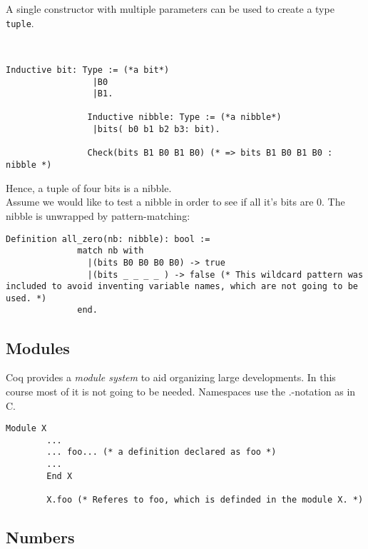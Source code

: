 	    A single constructor with multiple parameters can be used to create a type \lstinline!tuple!.
		\begin{example}~\\\vspace{-10mm}
	 	 	{\normalfont 
	 	 	    \begin{lstlisting}[caption = \lstinline!bit! and \lstinline!nibbel!]
	 	 		Inductive bit: Type := (*a bit*) 
	 	 		 |B0
	 	 		 |B1.
	 	 		 
	 		    Inductive nibble: Type := (*a nibble*)
	 		   	 |bits( b0 b1 b2 b3: bit).
	 		   			 	
	 		   	Check(bits B1 B0 B1 B0) (* => bits B1 B0 B1 B0 : nibble *)
	 		\end{lstlisting}
	 		Hence, a tuple of four bits is a nibble.\\ 		
	 		Assume we would like to test a nibble in order to see if all it's bits are 0. 
	 		The nibble is unwrapped by pattern-matching:
	 		\begin{lstlisting}[caption = \lstinline!all_zero!]
	 		Definition all_zero(nb: nibble): bool :=
	 		  match nb with
	 	  	    |(bits B0 B0 B0 B0) -> true
	 		    |(bits _ _ _ _ ) -> false (* This wildcard pattern was included to avoid inventing variable names, which are not going to be used. *) 
	 		  end.
	 		 \end{lstlisting}}
	 	\end{example}
	 	
	\subsection{Modules}
	
		Coq provides a {\itshape module system} to aid organizing large developments.
		In this course most of it is not going to be needed. Namespaces use the $.$-notation as in C.
	
		\begin{lstlisting}[caption = \lstinline!Module!]
		Module X 
		...
		... foo... (* a definition declared as foo *)
		...
		End X
		
		X.foo (* Referes to foo, which is definded in the module X. *)
		\end{lstlisting}
		
	\subsection{Numbers}
	
